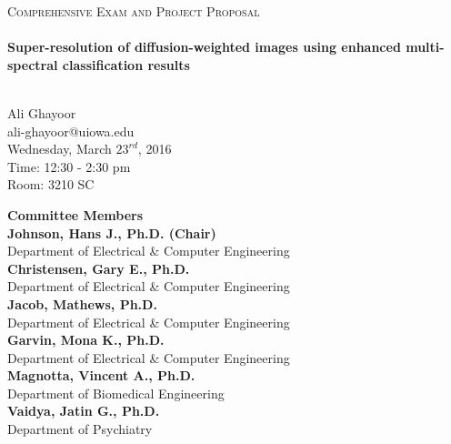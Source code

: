 
\begin{titlepage}

\begin{center}


\textsc{\Large Comprehensive Exam and Project Proposal}\\[0.5cm]

\HRule \\[0.4cm]
{\LARGE \bfseries
    Super-resolution of diffusion-weighted images using enhanced multi-spectral classification results
}\\[0.4cm]

\HRule \\[1.5cm]

\end{center}

\begin{flushleft}
\LARGE{Ali Ghayoor} \\
\large{ali-ghayoor@uiowa.edu} \\

\vspace{60pt} %
\large{Wednesday, March $23^{rd}$, 2016} \\
\large{Time: 12:30 - 2:30 pm} \\
\large{Room: 3210 SC}
\vspace{60pt} %

\Large{\textbf{Committee Members} }\\
\large{
\vspace{10pt}
{\bf Johnson, Hans J., Ph.D. (Chair) }\\
Department of Electrical \& Computer Engineering \\
\vspace{10pt}
{\bf Christensen, Gary E., Ph.D.}\\
Department of Electrical \& Computer Engineering \\
\vspace{10pt}
{\bf Jacob, Mathews, Ph.D.}\\
Department of Electrical \& Computer Engineering \\
\vspace{10pt}
{\bf Garvin, Mona K., Ph.D.}\\
Department of Electrical \& Computer Engineering \\
\vspace{10pt}
{\bf Magnotta, Vincent A., Ph.D.}\\
Department of Biomedical Engineering \\
\vspace{10pt}
{\bf Vaidya, Jatin G., Ph.D.}\\
Department of Psychiatry \\
}
\end{flushleft}

\end{titlepage}
